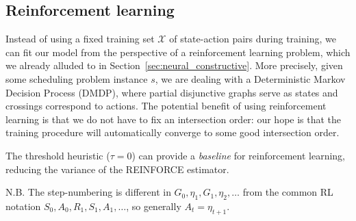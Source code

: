 \documentclass[a4paper]{article}
\theoremstyle{definition}
\theoremstyle{plain}
\begin{document}



\subsection{Reinforcement learning}

Instead of using a fixed training set $\mathcal{X}$ of state-action pairs during
training, we can fit our model from the perspective of a reinforcement learning
problem, which we already alluded to in Section~\ref{sec:neural_constructive}.
%
More precisely, given some scheduling problem instance $s$, we are dealing with
a Deterministic Markov Decision Process (DMDP), where partial disjunctive graphs
serve as states and crossings correspond to actions.
%
The potential benefit of using reinforcement learning is that we do not have to
fix an intersection order: our hope is that the training procedure will
automatically converge to some good intersection order.

{\color{Navy} The threshold heuristic ($\tau = 0$) can provide a
  \textit{baseline} for reinforcement learning, reducing the variance of the
  REINFORCE estimator.}

{\color{Navy} N.B. The step-numbering is different in
  $G_{0},\eta_{1},G_{1},\eta_{2}, \dots$ from the common RL notation
  $S_{0},A_{0},R_{1},S_{1},A_{1},\dots$, so generally $A_{t} = \eta_{t+1}$.}




\end{document}
